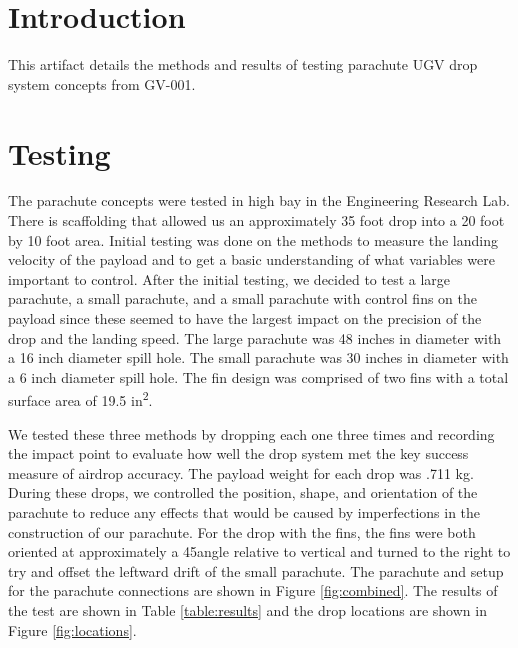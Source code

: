 \documentclass[]{auvsi_doc}
\begin{document}
\begin{AUVSITitlePage}
\begin{artifacttable}
\end{artifacttable}
\end{AUVSITitlePage}

\section{Introduction}
This artifact details the methods and results of testing parachute UGV drop system concepts from GV-001.

\section{Testing}
The parachute concepts were tested in high bay in the Engineering Research Lab. There is scaffolding that allowed us an approximately 35 foot drop into a 20 foot by 10 foot area. Initial testing was done on the methods to measure the landing velocity of the payload and to get a basic understanding of what variables were important to control. After the initial testing, we decided to test a large parachute, a small parachute, and a small parachute with control fins on the payload since these seemed to have the largest impact on the precision of the drop and the landing speed. The large parachute was 48 inches in diameter with a 16 inch diameter spill hole. The small parachute was 30 inches in diameter with a 6 inch diameter spill hole. The fin design was comprised of two fins with a total surface area of 19.5 in\textsuperscript{2}.

We tested these three methods by dropping each one three times and recording the impact point to evaluate how well the drop system met the key success measure of airdrop accuracy. The payload weight for each drop was .711 kg.  During these drops, we controlled the position, shape, and orientation of the parachute to reduce any effects that would be caused by imperfections in the construction of our parachute. For the drop with the fins, the fins were both oriented at approximately a 45\degree angle relative to vertical and turned to the right to try and offset the leftward drift of the small parachute. The parachute and setup for the parachute connections are shown in Figure \ref{fig:combined}. The results of the test are shown in Table \ref{table:results} and the drop locations are shown in Figure \ref{fig:locations}.
\end{document}

